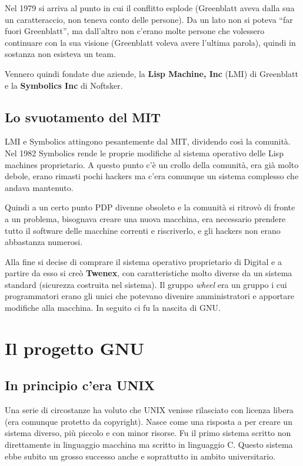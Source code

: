 Nel 1979 si arriva al punto in cui il conflitto esplode (Greenblatt aveva dalla sua un caratteraccio, non teneva conto delle persone). Da un lato non si poteva ``far fuori Greenblatt'', ma dall'altro non c'erano molte persone che volessero continuare con la sua visione (Greenblatt voleva avere l'ultima parola), quindi in sostanza non esisteva un team. 
 
 Vennero quindi fondate due aziende, la \textbf{Lisp Machine, Inc} (LMI) di Greenblatt e la \textbf{Symbolics Inc} di Noftsker.
 
 \subsection{Lo svuotamento del MIT}
 
LMI e Symbolics attingono pesantemente dal MIT, dividendo così la comunità. 
Nel 1982 Symbolics rende le proprie modifiche al sistema operativo delle Lisp machines proprietario. A questo punto c'è un crollo della comunità, era già molto debole, erano rimasti pochi hackers ma c'era comunque un sistema complesso che andava mantenuto. 
 
Quindi a un certo punto PDP divenne obsoleto e la comunità si ritrovò di fronte a un problema, bisognava creare una nuova macchina, era necessario prendere tutto il software delle macchine correnti e riscriverlo, e gli hackers non erano abbastanza numerosi. 
 
Alla fine si decise di comprare il sistema operativo proprietario di Digital e a partire da esso si creò \textbf{Twenex}, con caratteristiche molto diverse da un sistema standard (sicurezza costruita nel sistema). 
Il gruppo \textit{wheel} era un gruppo i cui programmatori erano gli unici che potevano divenire amministratori e apportare modifiche alla macchina. In seguito ci fu la nascita di GNU.

\section{Il progetto GNU}


\subsection{In principio c'era UNIX}

Una serie di circostanze ha voluto che UNIX venisse rilasciato con licenza libera (era comunque protetto da copyright). Nasce come una risposta a  per creare un sistema diverso, più piccolo e con minor risorse. Fu il primo sistema scritto non direttamente in linguaggio macchina ma scritto in linguaggio C. Questo sistema ebbe subito un grosso successo anche e soprattutto in ambito universitario. 

